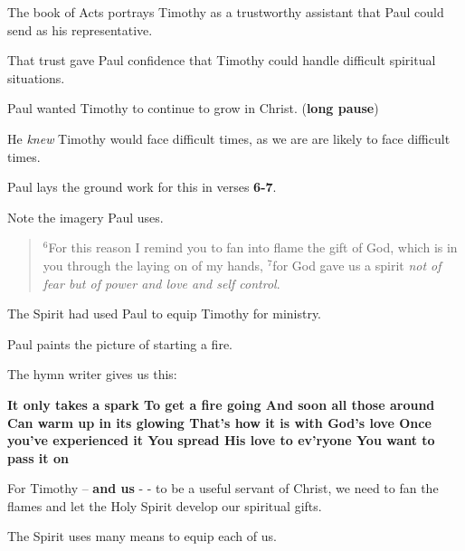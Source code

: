 \documentclass[12pt]{article} %
\newcommand{\superscript}[1]{\ensuremath{^{\textrm{#1}}}}
\begin{document}
The book of Acts portrays Timothy as
a trustworthy assistant that Paul could send as his representative.

That trust gave Paul confidence that Timothy could handle
difficult spiritual situations.

Paul wanted Timothy to continue to grow in Christ. (\textbf{long pause})

He \emph{knew} Timothy would
face difficult times, as we are are likely to face difficult times.

Paul lays the ground work for this in verses \textbf{6-7}.

Note the imagery Paul uses.

\begin{quote}
\superscript{6}For this reason I remind you to fan into flame the gift of God,
which is in you through the laying on of my hands, \superscript{7}for God gave
us a spirit \emph{not of fear but of power and love and self control}.
\end{quote}

The Spirit had used Paul to equip Timothy for ministry. 

Paul paints the picture of starting a fire.

The hymn writer gives us this:

\begin{flushleft} 
\textbf{
It only takes a spark\linebreak
To get a fire going\linebreak
And soon all those around\linebreak
Can warm up in its glowing\linebreak
That's how it is with God's love\linebreak
Once you've experienced it\linebreak
You spread His love to ev'ryone\linebreak
You want to pass it on  \linebreak
}
\end{flushleft}     

For Timothy  -- \textbf{and us} - -  to be a useful servant of Christ, we need to fan
the flames and let the Holy Spirit develop our spiritual gifts.

The Spirit uses many means to equip each of us.
\end{document}
